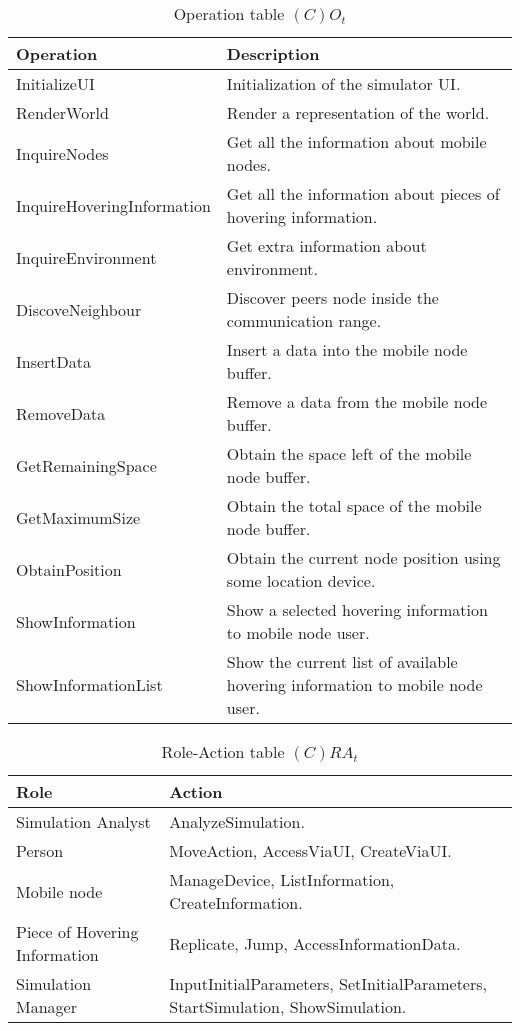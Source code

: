 \begin{table}[H]
	\centering
	\begin{tabular}{|p{5cm}|p{7cm}|}
			\hline
			\textbf{Operation} & \textbf{Description} \\
			\hline
			InitializeUI & Initialization of the simulator UI. \\
			\hline
			RenderWorld & Render a representation of the world. \\
			\hline
			InquireNodes & Get all the information about mobile nodes.\\
			\hline
			InquireHoveringInformation & Get all the information about pieces of
			hovering information.\\
			\hline
			InquireEnvironment & Get extra information about environment.\\
			\hline
			DiscoveNeighbour & Discover peers node inside the communication range. \\
			\hline
			InsertData & Insert a data into the mobile node buffer. \\
			\hline
			RemoveData & Remove a data from the mobile node buffer. \\
			\hline
			GetRemainingSpace & Obtain the space left of the mobile node buffer. \\
			\hline
			GetMaximumSize & Obtain the total space of the mobile node buffer. \\
			\hline
			ObtainPosition & Obtain the current node position using some location
			device. \\
			\hline
			ShowInformation & Show a selected hovering information to mobile node
			user.\\
			\hline
			ShowInformationList & Show the current list of available hovering
			information to mobile node user.\\
			\hline
		\end{tabular}
	\caption{Operation table $(C)O_t$}
	\label{tab:cot}
\end{table}

\begin{table}[H]
	\centering
	\begin{tabular}{|p{4cm}|p{8cm}|}
			\hline
			\textbf{Role} & \textbf{Action} \\
			\hline
			Simulation Analyst & AnalyzeSimulation. \\
			\hline
			Person & MoveAction, AccessViaUI, CreateViaUI. \\
			\hline
			Mobile node & ManageDevice, ListInformation, CreateInformation.  \\
			\hline
			Piece of Hovering Information & Replicate, Jump, AccessInformationData. \\
			\hline
			Simulation Manager & InputInitialParameters, SetInitialParameters,
			StartSimulation, ShowSimulation. \\
			\hline
		\end{tabular}
	\caption{Role-Action table $(C)RA_t$}
	\label{tab:rat}
\end{table}

